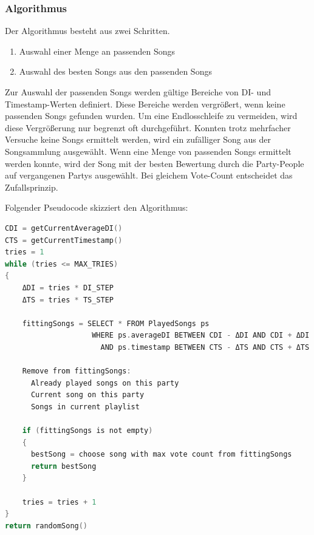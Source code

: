 \subsubsection{Algorithmus}
Der Algorithmus besteht aus zwei Schritten.
\begin{enumerate}
	\item Auswahl einer Menge an passenden Songs
	\item Auswahl des besten Songs aus den passenden Songs
\end{enumerate}

Zur Auswahl der passenden Songs werden gültige Bereiche von DI- und Timestamp-Werten definiert.
Diese Bereiche werden vergrößert, wenn keine passenden Songs gefunden wurden. Um eine Endlosschleife
zu vermeiden, wird diese Vergrößerung nur begrenzt oft durchgeführt. Konnten trotz mehrfacher 
Versuche keine Songs ermittelt werden, wird ein zufälliger Song aus der Songsammlung ausgewählt.
Wenn eine Menge von passenden Songs ermittelt werden konnte, wird der Song mit der besten
Bewertung durch die Party-People auf vergangenen Partys ausgewählt. Bei gleichem Vote-Count
entscheidet das Zufallsprinzip. 

Folgender Pseudocode skizziert den Algorithmus:
\begin{lstlisting}[language=C]
CDI = getCurrentAverageDI()
CTS = getCurrentTimestamp()
tries = 1
while (tries <= MAX_TRIES)
{
	ΔDI = tries * DI_STEP
	ΔTS = tries * TS_STEP
	
	fittingSongs = SELECT * FROM PlayedSongs ps
                    WHERE ps.averageDI BETWEEN CDI - ΔDI AND CDI + ΔDI
                      AND ps.timestamp BETWEEN CTS - ΔTS AND CTS + ΔTS
				   	 
	Remove from fittingSongs: 
	  Already played songs on this party
	  Current song on this party
	  Songs in current playlist
		
	if (fittingSongs is not empty)
	{
	  bestSong = choose song with max vote count from fittingSongs
	  return bestSong
	}
	
	tries = tries + 1
}
return randomSong()
\end{lstlisting}